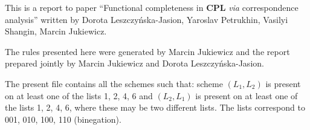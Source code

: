 \documentclass[11pt]{article}
\begin{document}
	
	This is a report to paper ``Functional completeness in \textbf{CPL} \textit{via} correspondence analysis'' written by Dorota Leszczy\'{n}ska-Jasion, 
	Yaroslav Petrukhin, Vasilyi Shangin, Marcin Jukiewicz. 
	
	The rules presented here were generated by Marcin Jukiewicz and the report prepared jointly by Marcin Jukiewicz and Dorota Leszczy\'{n}ska-Jasion.
	
	The present file contains all the schemes such that: scheme $(L_1, L_2)$ is present on at least one of the lists 1, 2, 4, 6 and $(L_2, L_1)$ is present on at least one of the lists 1, 2, 4, 6, where these may be two different lists. The lists correspond to 001, 010, 100, 110 (binegation).
	
	\bigskip
	
\begin{center}


\end{center}
\end{document}
